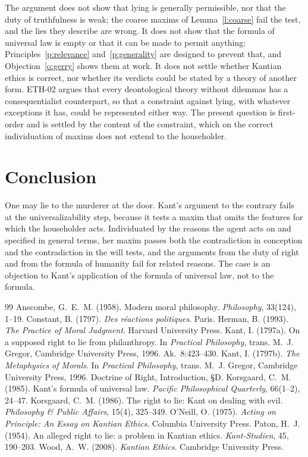 \documentclass{situationist-preprint}
\begin{document}
The argument does not show that lying is generally permissible, nor that the duty of truthfulness is weak; the coarse maxims of Lemma~\ref{l:coarse} fail the test, and the lies they describe are wrong. It does not show that the formula of universal law is empty or that it can be made to permit anything: Principles~\ref{p:relevance} and~\ref{p:generality} are designed to prevent that, and Objection~\ref{o:gerry} shows them at work. It does not settle whether Kantian ethics is correct, nor whether its verdicts could be stated by a theory of another form. ETH-02 argues that every deontological theory without dilemmas has a consequentialist counterpart, so that a constraint against lying, with whatever exceptions it has, could be represented either way. The present question is first-order and is settled by the content of the constraint, which on the correct individuation of maxims does not extend to the householder.

\section{Conclusion}

One may lie to the murderer at the door. Kant's argument to the contrary fails at the universalizability step, because it tests a maxim that omits the features for which the householder acts. Individuated by the reasons the agent acts on and specified in general terms, her maxim passes both the contradiction in conception and the contradiction in the will tests, and the arguments from the duty of right and from the formula of humanity fail for related reasons. The case is an objection to Kant's application of the formula of universal law, not to the formula.

\begin{thebibliography}{99}\small
{} Anscombe, G.~E.~M. (1958). Modern moral philosophy. \emph{Philosophy}, 33(124), 1--19.
 Constant, B. (1797). \emph{Des r\'eactions politiques}. Paris.
 Herman, B. (1993). \emph{The Practice of Moral Judgment}. Harvard University Press.
 Kant, I. (1797a). On a supposed right to lie from philanthropy. In \emph{Practical Philosophy}, trans. M.~J. Gregor, Cambridge University Press, 1996. Ak.~8:423--430.
 Kant, I. (1797b). \emph{The Metaphysics of Morals}. In \emph{Practical Philosophy}, trans. M.~J. Gregor, Cambridge University Press, 1996. Doctrine of Right, Introduction, \S D.
 Korsgaard, C.~M. (1985). Kant's formula of universal law. \emph{Pacific Philosophical Quarterly}, 66(1--2), 24--47.
 Korsgaard, C.~M. (1986). The right to lie: Kant on dealing with evil. \emph{Philosophy \& Public Affairs}, 15(4), 325--349.
 O'Neill, O. (1975). \emph{Acting on Principle: An Essay on Kantian Ethics}. Columbia University Press.
 Paton, H.~J. (1954). An alleged right to lie: a problem in Kantian ethics. \emph{Kant-Studien}, 45, 190--203.
 Wood, A.~W. (2008). \emph{Kantian Ethics}. Cambridge University Press.
\end{thebibliography}
\end{document}
